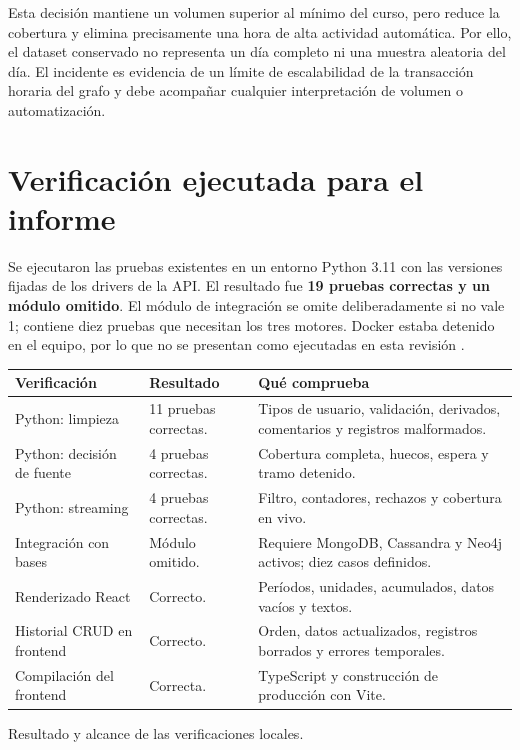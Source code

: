 Esta decisión mantiene un volumen superior al mínimo del curso, pero reduce la cobertura y elimina precisamente una hora de alta actividad automática. Por ello, el dataset conservado no representa un día completo ni una muestra aleatoria del día. El incidente es evidencia de un límite de escalabilidad de la transacción horaria del grafo y debe acompañar cualquier interpretación de volumen o automatización.

\section{Verificación ejecutada para el informe}
Se ejecutaron las pruebas existentes en un entorno Python 3.11 con las versiones fijadas de los drivers de la API. El resultado fue \textbf{19 pruebas correctas y un módulo omitido}. El módulo de integración se omite deliberadamente si  no vale 1; contiene diez pruebas que necesitan los tres motores. Docker estaba detenido en el equipo, por lo que no se presentan como ejecutadas en esta revisión \cite{verificacion}.

\begin{tabla}
\begin{tabularx}{\textwidth}{P{4.3cm}P{2.8cm}Y}
\toprule
Verificación & Resultado & Qué comprueba \\
\midrule
Python: limpieza & 11 pruebas correctas. & Tipos de usuario, validación, derivados, comentarios y registros malformados. \\
Python: decisión de fuente & 4 pruebas correctas. & Cobertura completa, huecos, espera y tramo detenido. \\
Python: streaming & 4 pruebas correctas. & Filtro, contadores, rechazos y cobertura en vivo. \\
Integración con bases & Módulo omitido. & Requiere MongoDB, Cassandra y Neo4j activos; diez casos definidos. \\
Renderizado React & Correcto. & Períodos, unidades, acumulados, datos vacíos y textos. \\
Historial CRUD en frontend & Correcto. & Orden, datos actualizados, registros borrados y errores temporales. \\
Compilación del frontend & Correcta. & TypeScript y construcción de producción con Vite. \\
\bottomrule
\end{tabularx}
\caption{Resultado y alcance de las verificaciones locales.}
\end{tabla}

